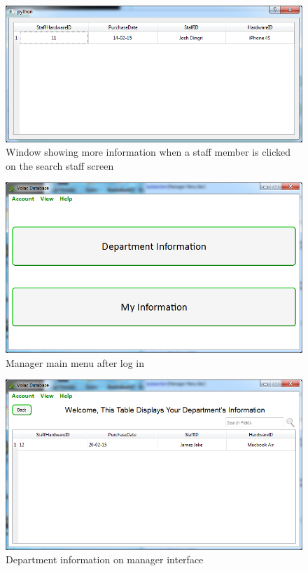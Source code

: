 \begin{figure}[H]
    \includegraphics[width=\textwidth]{./Maintenance/Images/searchstaffresult.png}
    \caption{Window showing more information when a staff member is clicked on the search staff screen} \label{fig:searchstaffresult}
\end{figure}

\begin{figure}[H]
    \includegraphics[width=\textwidth]{./Maintenance/Images/ManagerMM.png}
    \caption{Manager main menu after log in} \label{fig:ManagerMM}
\end{figure}

\begin{figure}[H]
    \includegraphics[width=\textwidth]{./Maintenance/Images/departinfo.png}
    \caption{Department information on manager interface} \label{fig:departinfo}
\end{figure}

